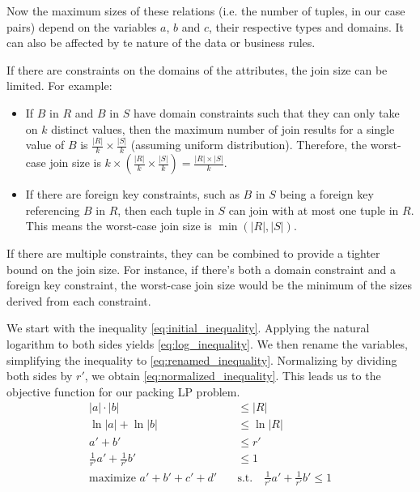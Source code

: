 Now the maximum sizes of these relations (i.e. the number of tuples, in our case pairs) depend on the
variables $a$, $b$ and $c$, their respective types and domains. It can also
be affected by te nature of the data or business rules.

If there are constraints on the domains of the attributes, the join size can be limited. For example:
    
\begin{itemize}
    \item If \( B \) in \( R \) and \( B \) in \( S \) have domain constraints such that they can only take on \( k \) distinct values, then the maximum number of join results for a single value of \( B \) is \( \frac{|R|}{k} \times \frac{|S|}{k} \) (assuming uniform distribution). Therefore, the worst-case join size is \( k \times \left( \frac{|R|}{k} \times \frac{|S|}{k} \right) = \frac{|R| \times |S|}{k} \).
    
    \item If there are foreign key constraints, such as \( B \) in \( S \) being a foreign key referencing \( B \) in \( R \), then each tuple in \( S \) can join with at most one tuple in \( R \). This means the worst-case join size is \( \min(|R|, |S|) \).
\end{itemize}
    
If there are multiple constraints, they can be combined to provide a tighter bound on the join size. For instance, if there's both a domain constraint and a foreign key constraint, the worst-case join size would be the minimum of the sizes derived from each constraint.

We start with the inequality \ref{eq:initial_inequality}. Applying the natural logarithm to both sides yields \ref{eq:log_inequality}. We then rename the variables, simplifying the inequality to \ref{eq:renamed_inequality}. 
Normalizing by dividing both sides by \(r'\), we obtain \ref{eq:normalized_inequality}. This leads us to the objective function for our packing LP problem.
\begin{align}
    |a| \cdot |b| &\leq |R| \label{eq:initial_inequality} \\
    \ln|a| + \ln|b| &\leq \ln|R| \label{eq:log_inequality} \\
    a' + b' &\leq r' \label{eq:renamed_inequality} \\
    \frac{1}{r'} a' + \frac{1}{r'} b' &\leq 1 \label{eq:normalized_inequality} \\
    \text{maximize } a' + b' + c' + d' \quad &\text{s.t.} \quad \frac{1}{r'} a' + \frac{1}{r'} b' \leq 1 \label{eq:objective_function}
    \end{align}

